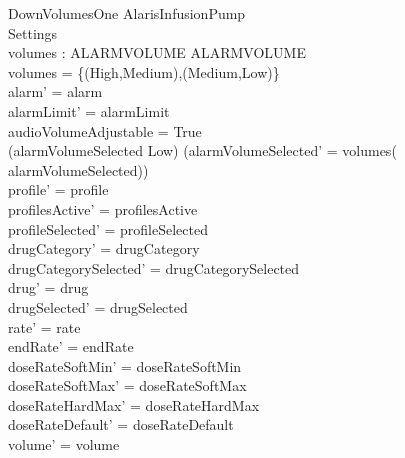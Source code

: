 \begin{schema}{DownVolumesOne}
	\Delta AlarisInfusionPump\\
	 Settings\\
	volumes : ALARMVOLUME \rel ALARMVOLUME\\
	\where
	volumes = \{(High,Medium),(Medium,Low)\}\\
	alarm' = alarm\\
	alarmLimit' = alarmLimit\\
	\pagebreak 
	audioVolumeAdjustable = True\\
	(alarmVolumeSelected \neq Low) \land (alarmVolumeSelected' = volumes(\\
	alarmVolumeSelected))\\
	profile' = profile\\
	profilesActive' = profilesActive\\  
	  profileSelected' = profileSelected\\
	drugCategory' = drugCategory\\ drugCategorySelected' = drugCategorySelected\\
	drug' = drug\\ drugSelected' = drugSelected\\
	rate' = rate\\
	endRate' = endRate\\
	doseRateSoftMin' = doseRateSoftMin\\
	doseRateSoftMax' = doseRateSoftMax\\
	doseRateHardMax' = doseRateHardMax\\
	doseRateDefault' = doseRateDefault\\
	volume' = volume\\

\end{schema}
